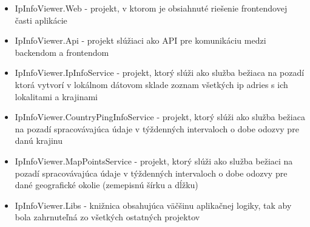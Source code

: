 \begin{itemize}
    \item IpInfoViewer.Web
    - projekt, v ktorom je obsiahnuté riešenie frontendovej časti aplikácie
    \item IpInfoViewer.Api
    - projekt slúžiaci ako API pre komunikáciu medzi backendom a frontendom
    \item IpInfoViewer.IpInfoService
    - projekt, ktorý slúži ako služba bežiaca na pozadí ktorá vytvorí v lokálnom dátovom sklade zoznam všetkých ip adries s ich lokalitami a krajinami
    \item IpInfoViewer.CountryPingInfoService
    - projekt, ktorý slúži ako služba bežiaca na pozadí spracovávajúca údaje v týždenných intervaloch o dobe odozvy pre danú krajinu
    \item IpInfoViewer.MapPointsService
    - projekt, ktorý slúži ako služba bežiaci na pozadí spracovávajúca údaje v týždenných intervaloch o dobe odozvy pre dané geografické 
    okolie (zemepisnú šírku a dĺžku)
    \item IpInfoViewer.Libs
    - knižnica obsahujúca väčšinu aplikačnej logiky, tak aby bola zahrnuteľná zo všetkých ostatných projektov
\end{itemize}

